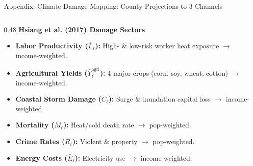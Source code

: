 \documentclass[aspectratio=169, 10pt]{beamer}
\begin{document}
\begin{frame}{Appendix: Climate Damage Mapping: County Projections to 3 Channels \hfill \hyperlink{main:damage_mapping}{\scriptsize{}}}\label{backup:damage_channels}
    \begin{columns}[T]
        \begin{column}{0.48\textwidth}
            \textbf{\small Hsiang et al. (2017) Damage Sectors}
            \vspace{0.04cm}
            \begin{itemize}\scriptsize\setlength{\itemsep}{2pt}
                \item \textbf{Labor Productivity ($\bar{L}_\ell$):} High- \& low-risk worker heat exposure $\to$ income-weighted.
                \item \textbf{Agricultural Yields ($\bar{Y}_\ell^{\text{agri}}$):} 4 major crops (corn, soy, wheat, cotton) $\to$ income-weighted.
                \item \textbf{Coastal Storm Damage ($\bar{C}_\ell$):} Surge \& inundation capital loss $\to$ income-weighted.
                \item \textbf{Mortality ($\bar{M}_\ell$):} Heat/cold death rate $\to$ pop-weighted.
                \item \textbf{Crime Rates ($\bar{R}_\ell$):} Violent \& property $\to$ pop-weighted.
                \item \textbf{Energy Costs ($\bar{E}_\ell$):} Electricity use $\to$ income-weighted.
            \end{itemize}
        \end{column}
        

\end{columns}
\end{frame}
\end{document}
